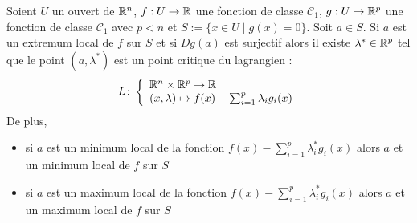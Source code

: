 \begin{theoreme}
    Soient $U$ un ouvert de $\mathbb{R}^n$, $f : U\to \mathbb{R}$ une fonction de classe $\mathcal C_1$, $g : U \to \mathbb{R}^p$ une fonction de classe $\mathcal C_1$ avec $p<n$ et $S:=\{x\in U\mid g(x) = 0\}$. Soit $a\in S$. Si $a$ est un extremum local de $f$ sur $S$ et si $Dg(a)$ est surjectif alors il existe $\lambda^*\in\mathbb{R}^p$ tel que le point $(a,\lambda^*)$ est un point critique du lagrangien : $$L\colon \left\{\begin{array}{l}\mathbb{R}^n\times\mathbb{R}^p\to \mathbb{R} \\(x,\lambda) \mapsto f(x)-\sum_{i = 1}^p\lambda_ig_i(x)\end{array}\right.$$
    De plus, \begin{itemize}
        \item si $a$ est un minimum local de la fonction $f(x) - \sum_{i=1}^{p} \lambda_i^*g_i(x)$ alors $a$ et un minimum local de $f$ sur $S$
        \item si $a$ est un maximum local de la fonction $f(x) - \sum_{i=1}^{p} \lambda_i^*g_i(x)$ alors $a$ et un maximum local de $f$ sur $S$
    \end{itemize}
\end{theoreme}

